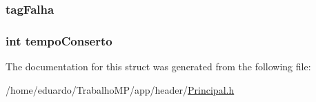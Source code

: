 \hypertarget{structinterconexao_ab6bff15141ec55edeb4370cdee3fe3d8}{
\subsubsection[{tag\-Falha}]{ tag\-Falha}}\label{structinterconexao_ab6bff15141ec55edeb4370cdee3fe3d8}
\hypertarget{structinterconexao_aadac5447051c1979a90f047e50e1119f}{
\subsubsection[{tempo\-Conserto}]{\setlength{\rightskip}{0pt plus 5cm}int tempo\-Conserto}}\label{structinterconexao_aadac5447051c1979a90f047e50e1119f}


The documentation for this struct was generated from the following file\-:\begin{DoxyCompactItemize}
\item 
/home/eduardo/\-Trabalho\-M\-P/app/header/\hyperlink{_principal_8h}{Principal.\-h}\end{DoxyCompactItemize}
